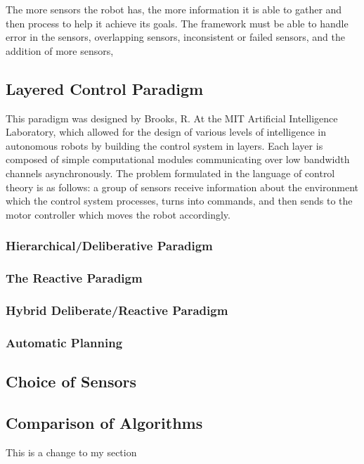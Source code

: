 The more sensors the robot has, the more information it is able to gather and then process to help it achieve its goals. The framework must be able to handle error in the sensors, overlapping sensors, inconsistent or failed sensors, and the addition of more sensors, 

\subsection*{Layered Control Paradigm \cite{Brooks:1985}}
This paradigm was designed by Brooks, R. At the MIT Artificial Intelligence Laboratory, which allowed for the design of various levels of intelligence in autonomous robots by building the control system in layers. Each layer is composed of simple computational modules communicating over low bandwidth channels asynchronously. The problem formulated in the language of control theory is as follows: a group of sensors receive information about the environment which the control system processes, turns into commands, and then sends to the motor controller which moves the robot accordingly.

\subsubsection*{Hierarchical/Deliberative Paradigm}
\subsubsection*{The Reactive Paradigm}
\subsubsection*{Hybrid Deliberate/Reactive Paradigm}
\subsubsection*{Automatic Planning}

\subsection*{Choice of Sensors}

\subsection*{Comparison of Algorithms}
This is a change to my section






